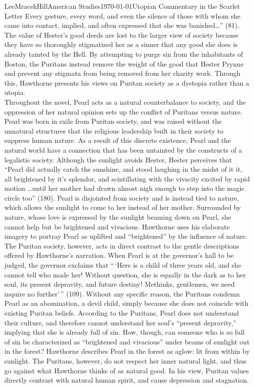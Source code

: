 \documentclass[12pt, letterpaper]{article}
\begin{document}
\begin{mla}{Lee}{Mracek}{Hill}{American Studies}{\today}{Utopian Commentary in the Scarlet Letter}
        Every gesture, every word, and even the silence of those with whom she came into contact, implied, and often expressed that she was banished\ldots'' (81). The value of Hester's good deeds are lost to the larger view of society because they have so thoroughly stigmatized her as a sinner that any good she does is already tainted by the Hell. By attempting to purge sin from the inhabitants of Boston, the Puritans instead remove the weight of the good that Hester Prynne  and prevent any stigmata from being removed from her charity work. Through this, Hawthorne presents his views on Puritan society as a dystopia rather than a utopia. \\
        Throughout the novel, Pearl acts as a natural counterbalance to society, and the oppression of her natural opinion sets up the conflict of Puritans versus nature. Pearl was born in exile from Puritan society, and was raised without the unnatural structures that the religious leadership built in their society to suppress human nature. As a result of this discrete existence, Pearl and the natural world have a connection that has been untainted by the constructs of a legalistic society. Although the sunlight avoids Hester, Hester perceives that ``Pearl did actually catch the sunshine, and stood laughing in the midst of it it, all brightened by it's splendor, and scintillating with the vivacity excited by rapid motion \ldots until her mother had drawn almost nigh enough to step into the magic circle too'' (180). Pearl is disjointed from society and is instead tied to nature, which allows the sunlight to come to her instead of her mother. Surrounded by nature, whose love is expressed by the sunlight beaming down on Pearl, she cannot help but be brightened and vivacious. Hawthorne uses his elaborate imagery to portray Pearl as uplifted and ``brightened'' by the influence of nature. The Puritan society, however, acts in direct contrast to the gentle descriptions offered by Hawthorne's narration. When Pearl is at the governor's hall to be judged, the governor exclaims that ``\,`Here is a child of three years old, and she cannot tell who made her! Without question, she is equally in the dark as to her soul, its present depravity, and future destiny! Methinks, gentlemen, we need inquire no further'\,'' (109). Without any specific reason, the Puritans condemn Pearl as an abomination, a devil child, simply because she does not coincide with existing Puritan beliefs. According to the Puritans, Pearl does not understand their culture, and therefore cannot understand her soul's ``present depravity,'' implying that she is already full of sin. How, though, can someone who is so full of sin be characterized as ``brightened and vivacious'' under beams of sunlight out in the forest? Hawthorne describes Pearl in the forest as aglow: lit from within by sunlight. The Puritans, however, do not respect her inner natural light, and thus go against what Hawthorne thinks of as natural good. In his view, Puritan values directly contrast with natural human spirit, and cause depression and stagnation.\\

\end{mla}
\end{document}

